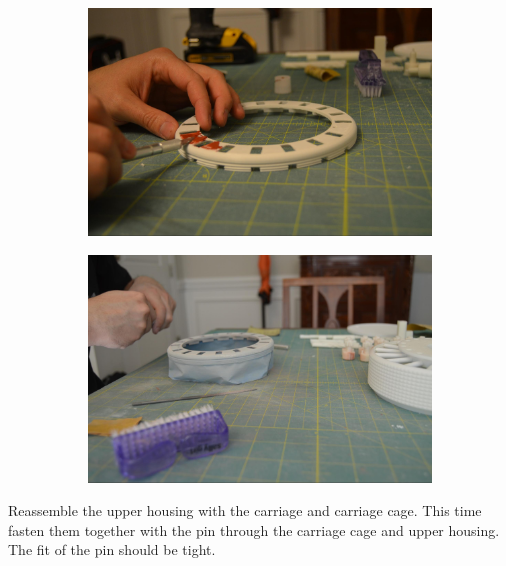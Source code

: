 \documentclass[openany]{book}
\begin{document}
\begin{figure}[!ht]
	\centering
	\begin{subfigure}{.4\textwidth}
		\centering
		\includegraphics[width=.95\textwidth]{images/image48.jpg}
		\caption{}
		\label{fig:image48}	
	\end{subfigure}
	\begin{subfigure}{.4\textwidth}
		\centering
		\includegraphics[width=.95\textwidth]{images/image20.jpg}
		\caption{}
		\label{fig:image20}	
	\end{subfigure}
	\caption{}
\end{figure}


Reassemble the upper housing with the carriage and carriage cage. This time fasten them together with the pin through the carriage cage and upper housing. The fit of the pin should be tight.
\end{document}
